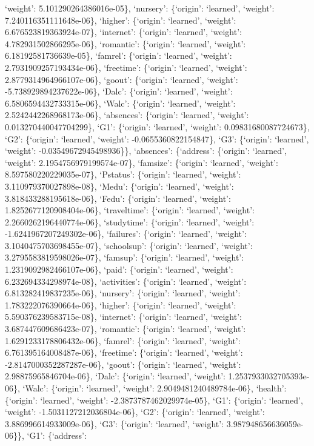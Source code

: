 \documentclass[
]{article}
\begin{document}
`weight': 5.101290264386016e-05\}, `nursery': \{`origin': `learned',
`weight': 7.240116351111648e-06\}, `higher': \{`origin': `learned',
`weight': 6.676523819363924e-07\}, `internet': \{`origin': `learned',
`weight': 4.782931502866295e-06\}, `romantic': \{`origin': `learned',
`weight': 6.18192581736639e-05\}, `famrel': \{`origin': `learned',
`weight': 2.7931909257193434e-06\}, `freetime': \{`origin': `learned',
`weight': 2.8779314964966107e-06\}, `goout': \{`origin': `learned',
`weight': -5.738929894237622e-06\}, `Dalc': \{`origin': `learned',
`weight': 6.5806594432733315e-06\}, `Walc': \{`origin': `learned',
`weight': 2.5242442268968173e-06\}, `absences': \{`origin': `learned',
`weight': 0.013270440047704299\}, `G1': \{`origin': `learned', `weight':
0.09831680087724673\}, `G2': \{`origin': `learned', `weight':
-0.0655360822154847\}, `G3': \{`origin': `learned', `weight':
-0.03549672945498936\}\}, `absences': \{`address': \{`origin':
`learned', `weight': 2.1954756979199574e-07\}, `famsize': \{`origin':
`learned', `weight': 8.597580220229035e-07\}, `Pstatus': \{`origin':
`learned', `weight': 3.110979370027898e-08\}, `Medu': \{`origin':
`learned', `weight': 3.818433288195618e-06\}, `Fedu': \{`origin':
`learned', `weight': 1.8252677120908404e-06\}, `traveltime': \{`origin':
`learned', `weight': 2.2660262196440774e-06\}, `studytime': \{`origin':
`learned', `weight': -1.6241967207249302e-06\}, `failures': \{`origin':
`learned', `weight': 3.1040475703698455e-07\}, `schoolsup': \{`origin':
`learned', `weight': 3.2795583819598026e-07\}, `famsup': \{`origin':
`learned', `weight': 1.2319092982466107e-06\}, `paid': \{`origin':
`learned', `weight': 6.232694334298974e-08\}, `activities': \{`origin':
`learned', `weight': 6.813282419837235e-06\}, `nursery': \{`origin':
`learned', `weight': 1.783222076390664e-06\}, `higher': \{`origin':
`learned', `weight': 5.590376239583715e-08\}, `internet': \{`origin':
`learned', `weight': 3.687447609686423e-07\}, `romantic': \{`origin':
`learned', `weight': 1.6291233178806432e-06\}, `famrel': \{`origin':
`learned', `weight': 6.761395164008487e-06\}, `freetime': \{`origin':
`learned', `weight': -2.8147000352287287e-06\}, `goout': \{`origin':
`learned', `weight': 2.98875965846704e-06\}, `Dalc': \{`origin':
`learned', `weight': 1.2537933032705393e-06\}, `Walc': \{`origin':
`learned', `weight': 2.9049481240489784e-06\}, `health': \{`origin':
`learned', `weight': -2.3873787462029974e-05\}, `G1': \{`origin':
`learned', `weight': -1.5031127212036804e-06\}, `G2': \{`origin':
`learned', `weight': 3.886996614933009e-06\}, `G3': \{`origin':
`learned', `weight': 3.987948656636059e-06\}\}, `G1': \{`address':
\end{document}
